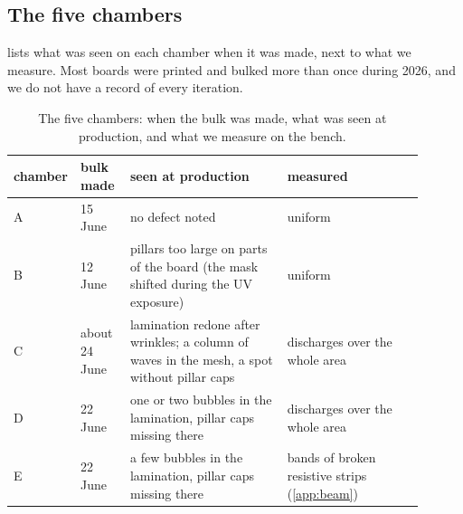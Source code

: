 \subsection{The five chambers}\label{app:chambers}
 lists what was seen on each chamber when it was made, next to what we measure. Most boards were
printed and bulked more than once during 2026, and we do not have a record of every iteration.

\begin{table}[tbp]
  \centering\small
  \caption{The five chambers: when the bulk was made, what was seen at production, and what we measure on the bench.}
  \label{tab:production}
  \begin{tabular}{p{0.07\linewidth}p{0.12\linewidth}p{0.38\linewidth}p{0.33\linewidth}}
    \hline
    chamber & bulk made & seen at production & measured \\
    \hline
    A & 15 June & no defect noted & uniform \\
    B & 12 June & pillars too large on parts of the board (the mask shifted during the UV exposure) & uniform \\
    C & about 24 June & lamination redone after wrinkles; a column of waves in the mesh, a spot without pillar caps & discharges over the whole area \\
    D & 22 June & one or two bubbles in the lamination, pillar caps missing there & discharges over the whole area \\
    E & 22 June & a few bubbles in the lamination, pillar caps missing there & bands of broken resistive strips (\cref{app:beam}) \\
    \hline
  \end{tabular}
\end{table}
